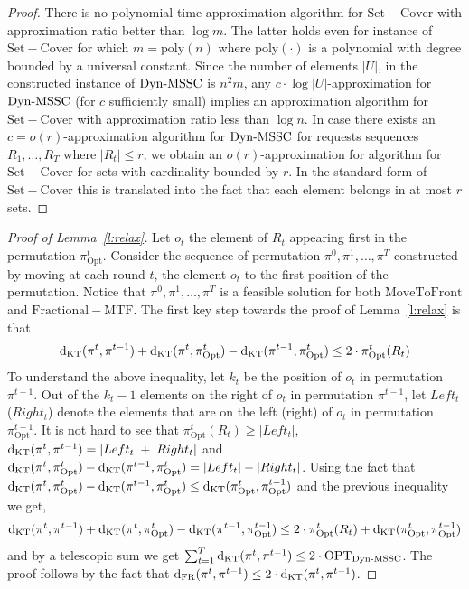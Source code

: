 \begin{proof}
\noindent There is no polynomial-time approximation algorithm for $\mathrm{Set}-\mathrm{Cover}$ with approximation ratio better than $\log m$. The latter holds even for instance of $\mathrm{Set}-\mathrm{Cover}$ for which $m = \mathrm{poly}(n)$ \cite{alon2006} where $\mathrm{poly}(\cdot)$ is a polynomial with degree bounded by a universal constant. Since the number of elements $|U|$, in the constructed instance of $\mathrm{Dyn}\text{-}\mathrm{MSSC}$ is $n^2m$, any $c\cdot \log |U|$-approximation for $\mathrm{Dyn}\text{-}\mathrm{MSSC}$ (for $c$ sufficiently small) implies an approximation algorithm for $\mathrm{Set}-\mathrm{Cover}$
with approximation ratio less than $\log n$. In case
there exists an $c=o(r)$-approximation algorithm for $\mathrm{Dyn}\text{-}\mathrm{MSSC}$ for requests sequences $R_1,\ldots,R_T$ where $|R_t|\leq r$, we obtain an $o(r)$-approximation for algorithm for $\mathrm{Set-Cover}$ for sets with cardinality bounded by $r$. In the standard form of $\mathrm{Set}-\mathrm{Cover}$ this is translated into the fact that each element belongs in at most $r$ sets.
\end{proof}

\begin{proof}[Proof of Lemma~\ref{l:relax}]
Let $o_t$ the element of $R_t$ appearing first in the permutation $\pi_{\mathrm{Opt}}^t$. Consider the sequence of permutation $\pi^0,\pi^1,\ldots,\pi^T$ constructed by moving at each round $t$, the element $o_t$ to the first position of the permutation. Notice that $\pi^0,\pi^1,\ldots,\pi^T$ is a feasible solution for both $\mathrm{MoveToFront}$ and $\mathrm{Fractional}-\mathrm{MTF}$. The first key step towards the proof of Lemma~\ref{l:relax} is that
\[\mathrm{d}_{\mathrm{KT}}(\pi^t,\pi^{t-1}) + \mathrm{d}_{\mathrm{KT}}(\pi^t,\pi^t_{\mathrm{Opt}}) - 
\mathrm{d}_{\mathrm{KT}}(\pi^{t-1},\pi^{t}_{\mathrm{Opt}}) \leq 2\cdot \pi^t_{\mathrm{Opt}}(R_t)
\]
To understand the above inequality, let $k_t$ be the position of $o_t$ in permutation $\pi^{t-1}$. Out of the $k_t - 1$ elements on the right of $o_t$ in permutation $\pi^{t-1}$, let $Left_t$ ($Right_t$) denote the elements that are on the left (right) of $o_t$ in permutation $\pi^{t-1}_{\mathrm{Opt}}$. It is not hard to see that $\pi^t_{\mathrm{Opt}}(R_t) \geq |Left_t|$, $\mathrm{d}_{\mathrm{KT}}(\pi^t,\pi^{t-1}) = |Left_t| + |Right_t|$ and  
$\mathrm{d}_{\mathrm{KT}}(\pi^t,\pi^t_{\mathrm{Opt}}) - 
\mathrm{d}_{\mathrm{KT}}(\pi^{t-1},\pi^{t}_{\mathrm{Opt}}) = |Left_t| - |Right_t|$. Using the fact that $\mathrm{d}_{\mathrm{KT}}(\pi^{t},\pi^{t}_{\mathrm{Opt}}) - \mathrm{d}_{\mathrm{KT}}(\pi^{t-1},\pi^{t}_{\mathrm{Opt}}) \leq \mathrm{d}_{\mathrm{KT}}(\pi^{t}_{\mathrm{Opt}},\pi^{t-1}_{\mathrm{Opt}})$ and the previous inequality we get,
\[\mathrm{d}_{\mathrm{KT}}(\pi^t,\pi^{t-1}) + \mathrm{d}_{\mathrm{KT}}(\pi^t,\pi^t_{\mathrm{Opt}})-
\mathrm{d}_{\mathrm{KT}}(\pi^{t-1},\pi^{t-1}_{\mathrm{Opt}})
\leq 
 2 \cdot \pi^t_{\mathrm{Opt}}(R_t) + \mathrm{d}_{\mathrm{KT}}(\pi^{t}_{\mathrm{Opt}},\pi^{t-1}_{\mathrm{Opt}})
\]
\noindent and by a telescopic sum we get $\sum_{t=1}^T \mathrm{d}_{\mathrm{KT}}(\pi^t,\pi^{t-1}) \leq 2\cdot \mathrm{OPT}_{\mathrm{Dyn}\text{-}\mathrm{MSSC}}$. The proof follows by the fact that $\mathrm{d}_{\mathrm{FR}}(\pi^t,\pi^{t-1}) \leq 2\cdot  \mathrm{d}_{\mathrm{KT}}(\pi^t,\pi^{t-1})$.
\end{proof}